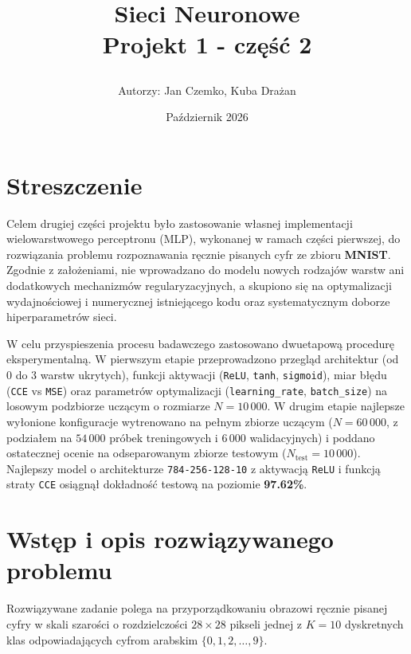 \documentclass{article}
\title{%

    \begin{figure}[h]
        \centering
        \hspace*{-1.5cm}
        
    \end{figure}
    
    \vspace{\baselineskip}
    \vspace{\baselineskip}
    \Huge \textbf{Sieci Neuronowe} \\
    \Huge Projekt 1 - część 2
     \vfill
    }
\author{Autorzy: Jan Czemko, Kuba Drażan
    \vspace{\baselineskip} }
\date{Październik 2026}
\begin{document}
\maketitle

\newpage

\section{Streszczenie}

Celem drugiej części projektu było zastosowanie własnej implementacji wielowarstwowego perceptronu (MLP), wykonanej w ramach części pierwszej, do rozwiązania problemu rozpoznawania ręcznie pisanych cyfr ze zbioru \textbf{MNIST}. Zgodnie z założeniami, nie wprowadzano do modelu nowych rodzajów warstw ani dodatkowych mechanizmów regularyzacyjnych, a skupiono się na optymalizacji wydajnościowej i numerycznej istniejącego kodu oraz systematycznym doborze hiperparametrów sieci.

W celu przyspieszenia procesu badawczego zastosowano dwuetapową procedurę eksperymentalną. W pierwszym etapie przeprowadzono przegląd architektur (od 0 do 3 warstw ukrytych), funkcji aktywacji (\texttt{ReLU}, \texttt{tanh}, \texttt{sigmoid}), miar błędu (\texttt{CCE} vs \texttt{MSE}) oraz parametrów optymalizacji (\texttt{learning\_rate}, \texttt{batch\_size}) na losowym podzbiorze uczącym o rozmiarze $N = 10\,000$. W drugim etapie najlepsze wyłonione konfiguracje wytrenowano na pełnym zbiorze uczącym ($N = 60\,000$, z podziałem na $54\,000$ próbek treningowych i $6\,000$ walidacyjnych) i poddano ostatecznej ocenie na odseparowanym zbiorze testowym ($N_{\text{test}} = 10\,000$). Najlepszy model o architekturze \texttt{784-256-128-10} z aktywacją \texttt{ReLU} i funkcją straty \texttt{CCE} osiągnął dokładność testową na poziomie \textbf{97.62\%}.


\section{Wstęp i opis rozwiązywanego problemu}

Rozwiązywane zadanie polega na przyporządkowaniu obrazowi ręcznie pisanej cyfry w skali szarości o rozdzielczości $28 \times 28$ pikseli jednej z $K = 10$ dyskretnych klas odpowiadających cyfrom arabskim $\{0, 1, 2, \dots, 9\}$.
\end{document}
